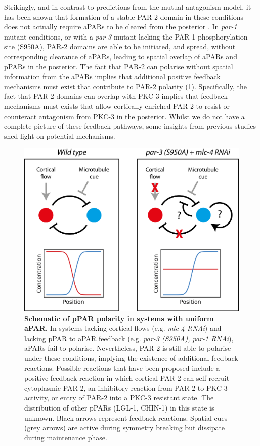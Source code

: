 \documentclass[12pt]{"report"}
\newcommand{\mycaption}[2]{\caption[#1]{\textbf{#1.} #2}}
\begin{document}
Strikingly, and in contrast to predictions from the mutual antagonism model, it has been shown that formation of a stable PAR-2 domain in these conditions does not actually require aPARs to be cleared from the posterior \citep{Motegi2011}. In \textit{par-1} mutant conditions, or with a \textit{par-3} mutant lacking the PAR-1 phosphorylation site (S950A), PAR-2 domains are able to be initiated, and spread, without corresponding clearance of aPARs, leading to spatial overlap of aPARs and pPARs in the posterior. The fact that PAR-2 can polarise without spatial information from the aPARs implies that additional positive feedback mechanisms must exist that contribute to PAR-2 polarity (\cref{fig:polarity_regimes_schematics}). Specifically, the fact that PAR-2 domains can overlap with PKC-3 implies that feedback mechanisms must exists that allow cortically enriched PAR-2 to resist or counteract antagonism from PKC-3 in the posterior. Whilst we do not have a complete picture of these feedback pathways, some insights from previous studies shed light on potential mechanisms.\\

\begin{figure}
\includegraphics[scale=1.1]{polarity_regimes_schematics}
\centering
\mycaption{Schematic of pPAR polarity in systems with uniform aPAR}{
In systems lacking cortical flows (e.g. \textit{mlc-4 RNAi}) and lacking pPAR to aPAR feedback (e.g. \textit{par-3 (S950A), par-1 RNAi}), aPARs fail to polarise. Nevertheless, PAR-2 is still able to polarise under these conditions, implying the existence of additional feedback reactions. Possible reactions that have been proposed include a positive feedback reaction in which cortical PAR-2 can self-recruit cytoplasmic PAR-2, an inhibitory reaction from PAR-2 to PKC-3 activity, or entry of PAR-2 into a PKC-3 resistant state. The distribution of other pPARs (LGL-1, CHIN-1) in this state is unknown. Black arrows represent feedback reactions. Spatial cues (grey arrows) are active during symmetry breaking but dissipate during maintenance phase.
}
\label{fig:polarity_regimes_schematics}
\end{figure}
\end{document}
